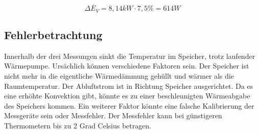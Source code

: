 $$\Delta \dot{E_V}= 8,14kW \cdot 7,5\%= 614W$$


\subsection{Fehlerbetrachtung}
Innerhalb der drei Messungen sinkt die Temperatur im Speicher,
trotz laufender Wärmepumpe. Ursächlich können verschiedene Faktoren sein. Der Speicher ist nicht mehr in die eigentliche Wärmedämmung gehüllt und wärmer als die Raumtemperatur. Der Abluftstrom ist in Richtung Speicher ausgerichtet. Da es eine erhöhte Konvektion gibt, könnte es zu einer beschleunigten Wärmeabgabe des Speichers kommen.
Ein weiterer Faktor könnte eine falsche Kalibrierung der Messgeräte sein oder Messfehler. Der Messfehler kann bei günstigeren Thermometern bis zu 2 Grad Celsius betragen.



